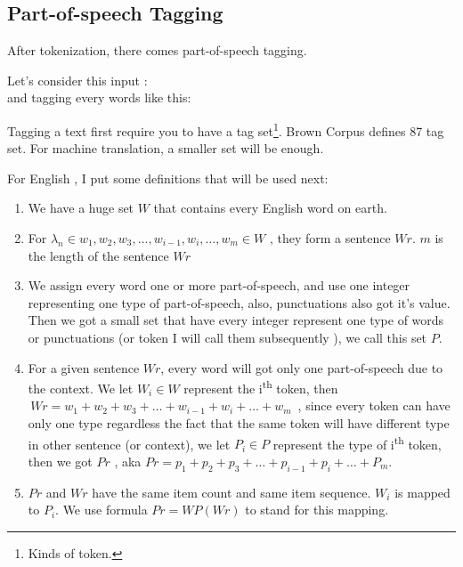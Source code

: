 \subsection{Part-of-speech Tagging}

After tokenization, there comes part-of-speech tagging.

Let's consider this input :
\\\indent
and tagging every words like this:

Tagging a text first require you to have a tag set\footnote{Kinds of token.}.
 Brown Corpus
 defines 87 tag set. For machine translation, a smaller set will be enough. 
 
For English ,  I put some definitions that will be used next:
\begin{enumerate}

\item We have a huge set $W$ that contains every English word on earth.

\item For $ \lambda_n \in w_1 , w_2 , w_3, \ldots , w_{i-1} , w_i  , \ldots , w_m \in W $ , they
		form a sentence $Wr$. $m$ is the length of the sentence $Wr$ 
\item We assign every word one or more part-of-speech, and use one integer representing  one type of part-of-speech, also, punctuations also got it's value. Then we got  a  small set that have every integer represent one type of words or punctuations (or token I will call them subsequently ), we call this set $ P $.
\item For a given sentence $Wr$, every word will got only one part-of-speech due to the context.
We let $W_i \in W $ represent the i\textsuperscript{th} token, then $ \, Wr = w_1 + w_2 + w_3 + \ldots + w_{i-1} + w_i  + \ldots + w_m  \, $ , since every token can have only one type regardless the fact that the same token will have different type in other sentence (or context), we let $P_i \in P $ represent the type of i\textsuperscript{th} token, then we got $Pr$ , aka $ Pr = p_1 + p_2 + p_3 + \ldots + p_{i-1} + p_i + \ldots + P_m $. 

\item $Pr $ and $ Wr $ have the same item count and same item sequence. $ W_i$ is mapped to $ P_i $. We use formula $ Pr = WP(Wr)$ to stand for this mapping. %
\end{enumerate}

